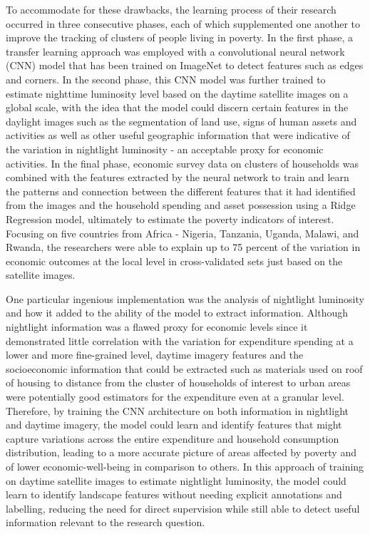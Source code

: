 \documentclass[solid,math,chem,code,plot,gloss]{bmc}
\begin{document}
To accommodate for these drawbacks, the learning process of their research occurred in three consecutive phases, each of which supplemented one another to improve the tracking of clusters of people living in poverty. In the first phase, a transfer learning approach was employed with a convolutional neural network (CNN) model that has been trained on ImageNet to detect features such as edges and corners. In the second phase, this CNN model was further trained to estimate nighttime luminosity level based on the daytime satellite images on a global scale, with the idea that the model could discern certain features in the daylight images such as the segmentation of land use, signs of human assets and activities as well as other useful geographic information that were indicative of the variation in nightlight luminosity - an acceptable proxy for economic activities. In the final phase, economic survey data on clusters of households was combined with the features extracted by the neural network to train and learn the patterns and connection between the different features that it had identified from the images and the household spending and asset possession using a Ridge Regression model, ultimately to estimate the poverty indicators of interest. Focusing on five countries from Africa - Nigeria, Tanzania, Uganda, Malawi, and Rwanda, the researchers were able to explain up to 75 percent of the variation in economic outcomes at the local level in cross-validated sets just based on the satellite images. 

One particular ingenious implementation was the analysis of nightlight luminosity and how it added to the ability of the model to extract information. Although nightlight information was a flawed proxy for economic levels since it demonstrated little correlation with the variation for expenditure spending at a lower and more fine-grained level, daytime imagery features and the socioeconomic information that could be extracted such as materials used on roof of housing to distance from the cluster of households of interest to urban areas were potentially good estimators for the expenditure even at a granular level. Therefore, by training the CNN architecture on both information in nightlight and daytime imagery, the model could learn and identify features that might capture variations across the entire expenditure and household consumption distribution, leading to a more accurate picture of areas affected by poverty and of lower economic-well-being in comparison to others. In this approach of training on daytime satellite images to estimate nightlight luminosity, the model could learn to identify landscape features without needing explicit annotations and labelling, reducing the need for direct supervision while still able to detect useful information relevant to the research question. 
\end{document}
